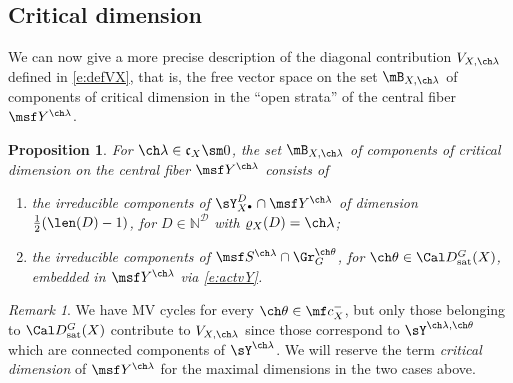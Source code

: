 \documentclass[final]{amsart}
\newtheorem{prop}[subsubsection]{Proposition}
\theoremstyle{remark}
\newtheorem{rem}[subsubsection]{Remark}
\theoremstyle{definition}
\numberwithin{equation}{section}
\begin{document}
\subsection{Critical dimension}



We can now give a more precise description of the diagonal contribution
$V_{X,\ch\lambda}$ defined in \eqref{e:defVX}, that is, the free vector space on the set $\mB_{X,\ch\lambda}$ of components of critical dimension in the ``open strata'' of the central fiber $\msf Y^{\ch\lambda}$. 

\begin{prop} \label{prop:Vbasis} 
For $\ch\lambda\in \mathfrak c_X \sm 0$, the set $\mB_{X,\ch\lambda}$ of components of critical dimension on the central fiber $\msf Y^{\ch\lambda}$ consists of
\begin{enumerate}
\item the irreducible components of $\sY^D_{X^\bullet}\cap \msf Y^{\ch\lambda}$ of dimension $\frac 1 2(\len(D)-1)$, 
for $D\in \mathbb N^{\mathcal D}$ with $\varrho_X(D) =\ch\lambda$;
\item the irreducible components of $\msf S^{\ch\lambda} \cap \Gr_G^{\ch\theta}$, 
for $\ch\theta \in \Cal D^G_{\mathrm{sat}}(X)$, embedded in $\msf Y^{\ch\lambda}$ via \eqref{e:actvY}.
\end{enumerate}
\end{prop}

\begin{rem} \label{rem:othertheta}
We have MV cycles for every $\ch\theta \in \mf c_X^-$, but only those belonging to $\Cal D^G_{\mathrm{sat}}(X)$ 
contribute to $V_{X,\ch\lambda}$ since those correspond to $\sY^{\ch\lambda,\ch\theta}$ which are
connected components of $\sY^{\ch\lambda}$. We will reserve the term \emph{critical dimension} of 
$\msf Y^{\ch\lambda}$ for the maximal dimensions in the two cases above. 
\end{rem}
\end{document}
